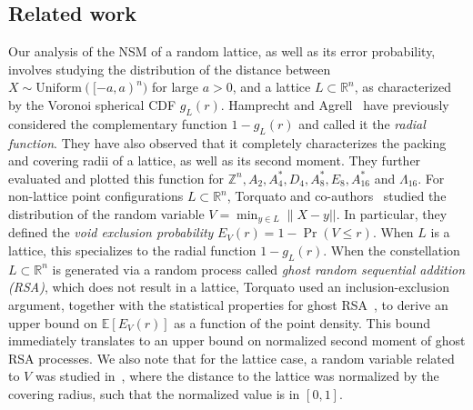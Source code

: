 \documentclass[article,doublecolumn]{IEEEtran}
\newcommand{\EE}{{\mathbb{E}}}
\newcommand{\R}{{\mathbb{R}}}
\newcommand{\Z}{{\mathbb{Z}}}
\newcommand{\Unif}{\mathrm{Uniform}}
\newcommand{\VcdfL}{g_L}
\begin{document}
\subsection{Related work}

Our analysis of the NSM of a random lattice, as well as its error probability, involves studying the distribution of the distance between $X\sim\Unif([-a,a)^n)$ for large $a>0$, and a lattice $L\subset\R^n$, as characterized by the Voronoi spherical CDF $\VcdfL(r)$. Hamprecht and Agrell~\cite{hamprecht2003exploring} have previously considered the complementary function $1-\VcdfL(r)$ and called it the \emph{radial function}. They have also observed that it completely characterizes the packing and covering radii of a lattice, as well as its second moment. They further evaluated and plotted this function for $\Z^n,A_2,A^*_4,D_4,A^*_8,E_8,A^*_{16}$ and $\Lambda_{16}$. For non-lattice point configurations $L\subset\R^n$, Torquato and co-authors~\cite{torquato1990nearest,torquato2010reformulation} studied the distribution of the random variable $V=\min_{y\in L}\|X-y||$. In particular, they defined the \emph{void exclusion probability} $E_V(r)=1-\Pr(V\leq r)$. When $L$ is a lattice, this specializes to the radial function $1-\VcdfL(r)$. When the constellation $L\subset \R^n$ is generated via a random process called \emph{ghost random sequential addition (RSA)}, which does not result in a lattice, Torquato used an inclusion-exclusion argument, together with the statistical properties for ghost RSA~\cite{torquato2006exactly}, to derive an upper bound on $\EE[E_V(r)]$ as a function of the point density. This bound immediately translates to an upper bound on normalized second moment of ghost RSA processes. We  also note that for the lattice case, a random variable related to $V$ was studied in~\cite{haviv2009note}, where the distance to the lattice was normalized by the covering radius, such that the normalized value is in $[0,1]$.

\medskip
\end{document}

